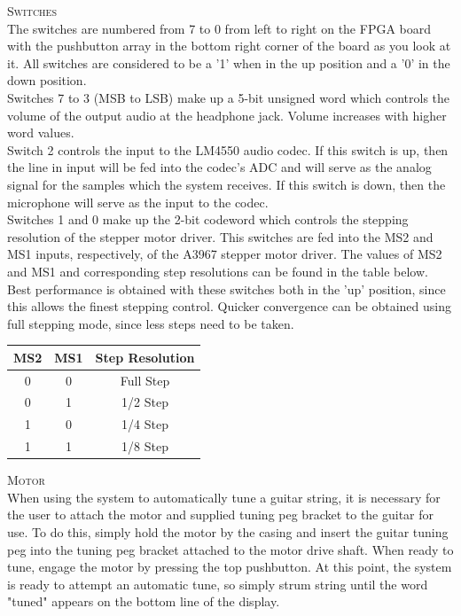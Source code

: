 \documentclass[aps,letterpaper,10pt]{revtex4}
\begin{document}
\textsc{Switches} \\

The switches are numbered from 7 to 0 from left to right on the FPGA board with the pushbutton array in the bottom right corner of the board as you look at it. All switches are considered to be a '1' when in the up position and a '0' in the down position. \\

Switches 7 to 3 (MSB to LSB) make up a 5-bit unsigned word which controls the volume of the output audio at the headphone jack. Volume increases with higher word values.\\

Switch 2 controls the input to the LM4550 audio codec. If this switch is up, then the line in input will be fed into the codec's ADC and will serve as the analog signal for the samples which the system receives. If this switch is down, then the microphone will serve as the input to the codec. \\

Switches 1 and 0 make up the 2-bit codeword which controls the stepping resolution of the stepper motor driver. This switches are fed into the MS2 and MS1 inputs, respectively, of the A3967 stepper motor driver. The values of MS2 and MS1 and corresponding step resolutions can be found in the table below. Best performance is obtained with these switches both in the 'up' position, since this allows the finest stepping control. Quicker convergence can be obtained using full stepping mode, since less steps need to be taken.

\begin{center}
\begin{tabular}{|c|c|c|}
\hline
MS2 & MS1 &  Step Resolution \\
\hline
0 & 0 & Full Step \\
0 & 1 & 1/2 Step \\
1 & 0 & 1/4 Step \\
1 & 1 & 1/8 Step \\
\hline
\end{tabular}
\end{center}

\textsc{Motor} \\

When using the system to automatically tune a guitar string, it is necessary for the user to attach the motor and supplied tuning peg bracket to the guitar for use. To do this, simply hold the motor by the casing and insert the guitar tuning peg into the tuning peg bracket attached to the motor drive shaft. When ready to tune, engage the motor by pressing the top pushbutton. At this point, the system is ready to attempt an automatic tune, so simply strum string until the word "tuned" appears on the bottom line of the display.\\
\end{document}
